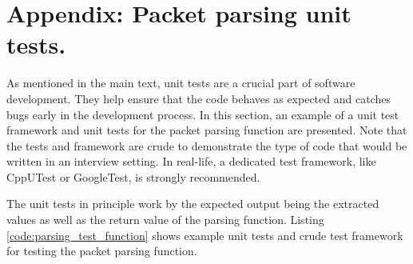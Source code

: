 \documentclass[main.tex]{subfiles}
\begin{document}
\section{Appendix: Packet parsing unit tests.} \label{appendix:packet_parsing_tests}
As mentioned in the main text, unit tests are a crucial part of software development. They help ensure that the code behaves as expected and catches bugs early in the development process. In this section, an example of a unit test framework and unit tests for the packet parsing function are presented. Note that the tests and framework are crude to demonstrate the type of code that would be written in an interview setting. In real-life, a dedicated test framework, like CppUTest or GoogleTest, is strongly recommended. \newline

\newnoindentpara The unit tests in principle work by the expected output being the extracted values as well as the return value of the parsing function. Listing \ref{code:parsing_test_function} shows example unit tests and crude test framework for testing the packet parsing function.


\end{document}
